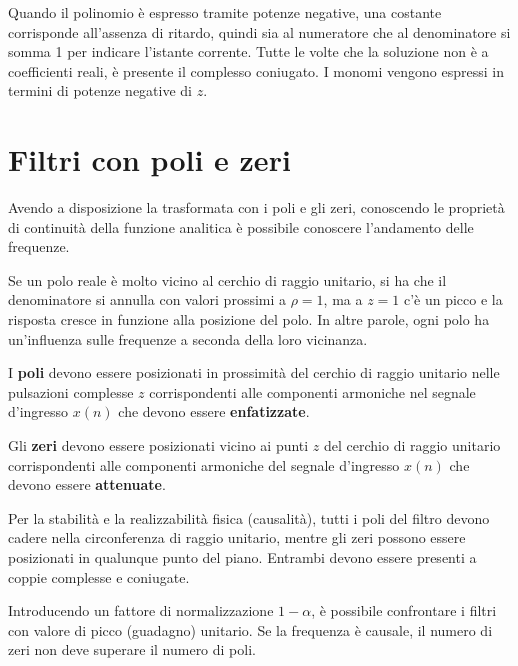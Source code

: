 Quando il polinomio è espresso tramite potenze negative, una costante corrisponde all'assenza di ritardo, quindi sia al numeratore che al denominatore si somma 1 per indicare l'istante corrente. Tutte le volte che la soluzione non è a coefficienti reali, è presente il complesso coniugato. I monomi vengono espressi in termini di potenze negative di $z$.

\section{Filtri con poli e zeri}
Avendo a disposizione la trasformata con i poli e gli zeri, conoscendo le proprietà di continuità della funzione analitica è possibile conoscere l'andamento delle frequenze.

Se un polo reale è molto vicino al cerchio di raggio unitario, si ha che il denominatore si annulla con valori prossimi a $\rho = 1$, ma a $z = 1$ c'è un picco e la risposta cresce in funzione alla posizione del polo. In altre parole, ogni polo ha un'influenza sulle frequenze a seconda della loro vicinanza.

I \textbf{poli} devono essere posizionati in prossimità del cerchio di raggio unitario nelle pulsazioni complesse $z$ corrispondenti alle componenti armoniche nel segnale d'ingresso $x(n)$ che devono essere \textbf{enfatizzate}.

Gli \textbf{zeri} devono essere posizionati vicino ai punti $z$ del cerchio di raggio unitario corrispondenti alle componenti armoniche del segnale d'ingresso $x(n)$ che devono essere \textbf{attenuate}.

Per la stabilità e la realizzabilità fisica (causalità), tutti i poli del filtro devono cadere nella circonferenza di raggio unitario, mentre gli zeri possono essere posizionati in qualunque punto del piano. Entrambi devono essere presenti a coppie complesse e coniugate.

Introducendo un fattore di normalizzazione $1 - \alpha$, è possibile confrontare i filtri con valore di picco (guadagno) unitario. Se la frequenza è causale, il numero di zeri non deve superare il numero di poli.

